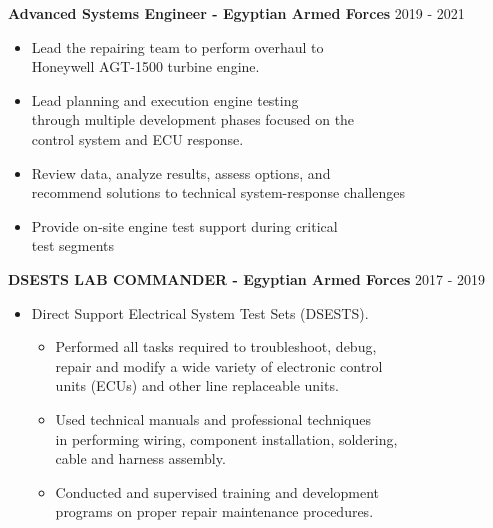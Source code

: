 \documentclass[10pt]{article}
\newenvironment{outerlist}[1][\enskip\textbullet]%
        {\begin{itemize}[#1,leftmargin=*]}{\end{itemize}%
         \vspace{-.6\baselineskip}}
\newenvironment{innerlist}[1][\enskip\textbullet]%
        {\begin{itemize}[#1,leftmargin=*,parsep=0pt,itemsep=0pt,topsep=0pt,partopsep=0pt]}
        {\end{itemize}}
\begin{document}
\vspace{.1in}
\textbf{Advanced Systems Engineer - Egyptian Armed Forces} \hfill {2019 - 2021}
\begin{innerlist}
                \item Lead the repairing team to perform overhaul to\\
                Honeywell AGT-1500 turbine engine.
                \item Lead planning and execution engine testing\\
                through multiple development phases focused on the\\
                control system and ECU response.
                \item Review data, analyze results, assess options, and\\
                recommend solutions to technical system-response challenges
                \item Provide on-site engine test support during critical\\
                 test segments
\end{innerlist}

\vspace{.1in}
\textbf{DSESTS LAB COMMANDER - Egyptian Armed Forces} \hfill {2017 - 2019}
\begin{outerlist}
        \item[] Direct Support Electrical System Test Sets (DSESTS).
        \begin{innerlist}
                \item Performed all tasks required to troubleshoot, debug, \\
                repair and modify a wide variety of electronic control\\
                units (ECUs) and other line replaceable units.
                \item Used technical manuals and professional techniques\\ 
                in performing wiring, component installation, soldering,\\ 
                cable and harness assembly.
                \item Conducted and supervised training and development \\
                programs on proper repair maintenance procedures.

        \end{innerlist}

\end{outerlist}
\end{document}
